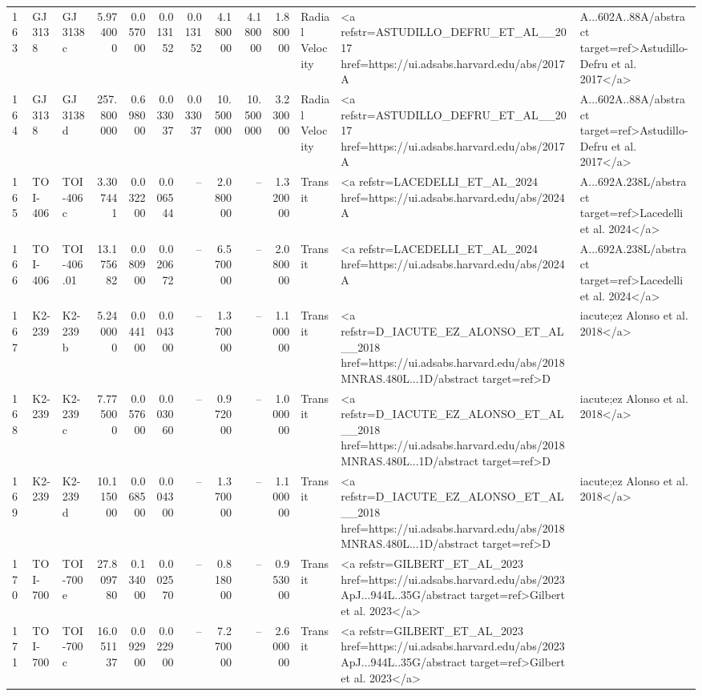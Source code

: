 \begin{tabular}{lllrrrrrrrll}
163 & GJ 3138 & GJ 3138 c & 5.974000 & 0.057000 & 0.013152 & 0.013152 & 4.180000 & 4.180000 & 1.880000 & Radial Velocity & <a refstr=ASTUDILLO_DEFRU_ET_AL__2017 href=https://ui.adsabs.harvard.edu/abs/2017A&A...602A..88A/abstract target=ref>Astudillo-Defru et al. 2017</a> \\
164 & GJ 3138 & GJ 3138 d & 257.800000 & 0.698000 & 0.033037 & 0.033037 & 10.500000 & 10.500000 & 3.230000 & Radial Velocity & <a refstr=ASTUDILLO_DEFRU_ET_AL__2017 href=https://ui.adsabs.harvard.edu/abs/2017A&A...602A..88A/abstract target=ref>Astudillo-Defru et al. 2017</a> \\
165 & TOI-406 & TOI-406 c & 3.307441 & 0.032200 & 0.006544 & -- & 2.080000 & -- & 1.320000 & Transit & <a refstr=LACEDELLI_ET_AL_2024 href=https://ui.adsabs.harvard.edu/abs/2024A&A...692A.238L/abstract target=ref>Lacedelli et al. 2024</a> \\
166 & TOI-406 & TOI-406.01 & 13.175682 & 0.080900 & 0.020672 & -- & 6.570000 & -- & 2.080000 & Transit & <a refstr=LACEDELLI_ET_AL_2024 href=https://ui.adsabs.harvard.edu/abs/2024A&A...692A.238L/abstract target=ref>Lacedelli et al. 2024</a> \\
167 & K2-239 & K2-239 b & 5.240000 & 0.044100 & 0.004300 & -- & 1.370000 & -- & 1.100000 & Transit & <a refstr=D_IACUTE_EZ_ALONSO_ET_AL__2018 href=https://ui.adsabs.harvard.edu/abs/2018MNRAS.480L...1D/abstract target=ref>D&iacute;ez Alonso et al. 2018</a> \\
168 & K2-239 & K2-239 c & 7.775000 & 0.057600 & 0.003060 & -- & 0.972000 & -- & 1.000000 & Transit & <a refstr=D_IACUTE_EZ_ALONSO_ET_AL__2018 href=https://ui.adsabs.harvard.edu/abs/2018MNRAS.480L...1D/abstract target=ref>D&iacute;ez Alonso et al. 2018</a> \\
169 & K2-239 & K2-239 d & 10.115000 & 0.068500 & 0.004300 & -- & 1.370000 & -- & 1.100000 & Transit & <a refstr=D_IACUTE_EZ_ALONSO_ET_AL__2018 href=https://ui.adsabs.harvard.edu/abs/2018MNRAS.480L...1D/abstract target=ref>D&iacute;ez Alonso et al. 2018</a> \\
170 & TOI-700 & TOI-700 e & 27.809780 & 0.134000 & 0.002570 & -- & 0.818000 & -- & 0.953000 & Transit & <a refstr=GILBERT_ET_AL_2023 href=https://ui.adsabs.harvard.edu/abs/2023ApJ...944L..35G/abstract target=ref>Gilbert et al. 2023</a> \\
171 & TOI-700 & TOI-700 c & 16.051137 & 0.092900 & 0.022900 & -- & 7.270000 & -- & 2.600000 & Transit & <a refstr=GILBERT_ET_AL_2023 href=https://ui.adsabs.harvard.edu/abs/2023ApJ...944L..35G/abstract target=ref>Gilbert et al. 2023</a> \\

\end{tabular}
